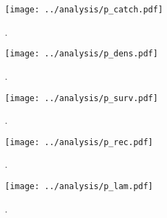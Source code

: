 \documentclass[11pt]{article}
\begin{document}
\clearpage
\begin{figure}
\centering
\texttt{[image: ../analysis/p\_catch.pdf]}
\caption{\label{fig:p_catch}
.
}
\end{figure}
\clearpage

\clearpage
\begin{figure}
\centering
\texttt{[image: ../analysis/p\_dens.pdf]}
\caption{\label{fig:p_dens}
.
}
\end{figure}
\clearpage

\clearpage
\begin{figure}
\centering
\texttt{[image: ../analysis/p\_surv.pdf]}
\caption{\label{fig:p_surv}
.
}
\end{figure}
\clearpage

\clearpage
\begin{figure}
\centering
\texttt{[image: ../analysis/p\_rec.pdf]}
\caption{\label{fig:p_rec}
.
}
\end{figure}
\clearpage

\clearpage
\begin{figure}
\centering
\texttt{[image: ../analysis/p\_lam.pdf]}
\caption{\label{fig:p_lam}
.
}
\end{figure}
\clearpage





\end{document}
